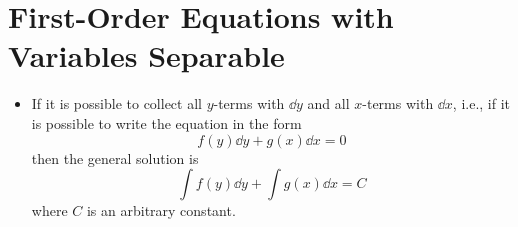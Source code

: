 \documentclass[../main.tex]{subfiles}
\begin{document}
\section{First-Order Equations with Variables Separable}
\begin{itemize}
    \item If it is possible to collect all $y$-terms with $\dd{y}$ and all $x$-terms with $\dd{x}$, i.e., if it is possible to write the equation in the form
    \begin{equation*}
        f(y)\dd{y}+g(x)\dd{x} = 0
    \end{equation*}
    then the general solution is
    \begin{equation*}
        \int f(y)\dd{y}+\int g(x)\dd{x} = C
    \end{equation*}
    where $C$ is an arbitrary constant.
\end{itemize}
\end{document}
